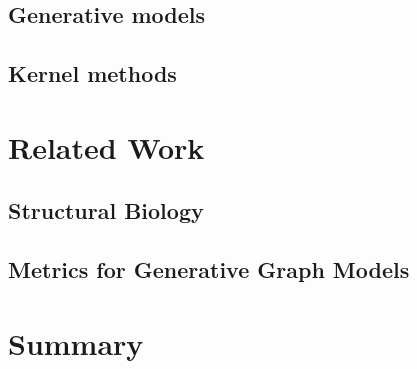 \subsection{Generative models}

\subsection{Kernel methods}

\section{Related Work}\label{sec:related}

\subsection{Structural Biology}

\subsection{Metrics for Generative Graph Models}

\section{Summary}

